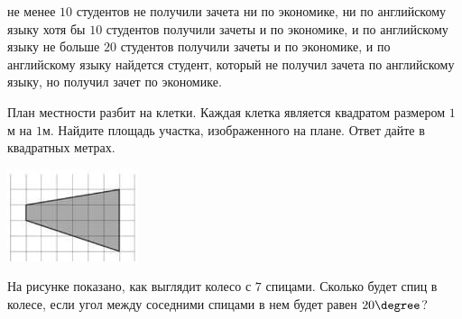 \begin{class}[number=5]
\begin{listofex}
		\begin{tasks}
			\task не менее \(10\) студентов не получили зачета ни по экономике, ни по английскому языку
			\task хотя бы \(10\) студентов получили зачеты и по экономике, и по английскому языку
			\task не больше \(20\) студентов получили зачеты и по экономике, и по английскому языку
			\task найдется студент, который не получил зачета по английскому языку, но получил зачет по экономике.
		\end{tasks}
		\item
		\begin{minipage}[t]{\bodywidth}
			План местности разбит на клетки. Каждая клетка является квадратом размером \(1\)м на \(1\)м. Найдите площадь участка, изображенного на плане. Ответ дайте в квадратных метрах.
		\end{minipage}
		\hspace{0.02\linewidth}
		\begin{minipage}[t]{\picwidth}
			\includegraphics[align=t, width=\linewidth]{../pics/G101M8L5-4}
		\end{minipage}
		\item 
		\begin{minipage}[t]{\bodywidth}
			На рисунке показано, как выглядит колесо с \(7\) спицами. Сколько будет спиц в колесе, если угол между соседними спицами в нем будет равен \(20 \degree \)?
		\end{minipage}
		\hspace{0.02\linewidth}
		\begin{minipage}[t]{\picwidth}

\end{minipage}
\end{listofex}
\end{class}
